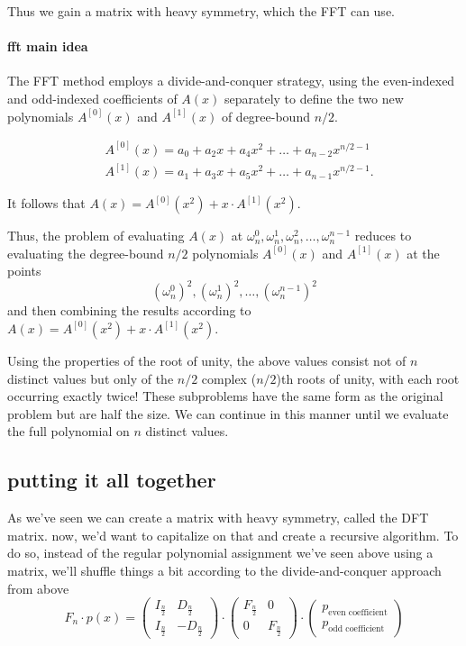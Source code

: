  Thus we gain a matrix with heavy symmetry, which the FFT can use.

\paragraph{fft main idea}
The FFT method employs a divide-and-conquer strategy, 
using the even-indexed and odd-indexed coefficients of $A(x)$
separately to define the two new polynomials $A^{[0]}(x)$ and $A^{[1]}(x)$ of degree-bound $n/2$.

\begin{align}
  &A^{[0]}(x) =  a_0 +a_2x + a_4x^2 + \dots + a_{n-2}x^{n/2-1}\\
  &A^{[1]}(x) =  a_1 +a_3x + a_5x^2 + \dots + a_{n-1}x^{n/2-1}.
\end{align}


It follows that $A(x)=A^{[0]}(x^2) + x\cdot A^{[1]}(x^2)$.

Thus, the problem of evaluating $A(x)$ at 
$\omega_n^0, \omega_n^1, \omega_n^2,\dots, \omega_n^{n-1}$ 
reduces to evaluating the degree-bound $n/2$ polynomials  $A^{[0]}(x)$ and $A^{[1]}(x)$ at the points
$$(\omega_n^0)^2, (\omega_n^1)^2,\dots, (\omega_n^{n-1})^2$$
and then combining the results according to $A(x)=A^{[0]}(x^2) + x\cdot A^{[1]}(x^2)$.


Using the properties of the root of unity, 
the above values consist not of $n$ distinct values but only of the $n/2$
 complex ($n/2$)th roots of unity, with each root occurring exactly twice!
These subproblems have the same form as the original problem but are half the size.
We can continue in this manner until we evaluate the full polynomial on $n$ distinct values.


\subsection{putting it all together}
As we've seen we can create a matrix with heavy symmetry, called the DFT matrix. 
now, we'd want to capitalize on that and create a recursive algorithm.
To do so, instead of the regular polynomial assignment we've seen above using a matrix,  
we'll shuffle things a bit according to the divide-and-conquer approach from above
$$
F_n \cdot p(x) = 
\begin{pmatrix}
  I_{ \frac{n}{2}} & D_{\frac{n}{2}} \\
  I_{ \frac{n}{2}} & -D_{\frac{n}{2}}
 \end{pmatrix}
 \cdot 
 \begin{pmatrix}
  F_{ \frac{n}{2}} & 0 \\
  0 & F_{ \frac{n}{2}} 
\end{pmatrix}
\cdot 
\begin{pmatrix}
  p_{\text{even coefficient}} \\
  p_{\text{odd coefficient}}
\end{pmatrix}
 $$

